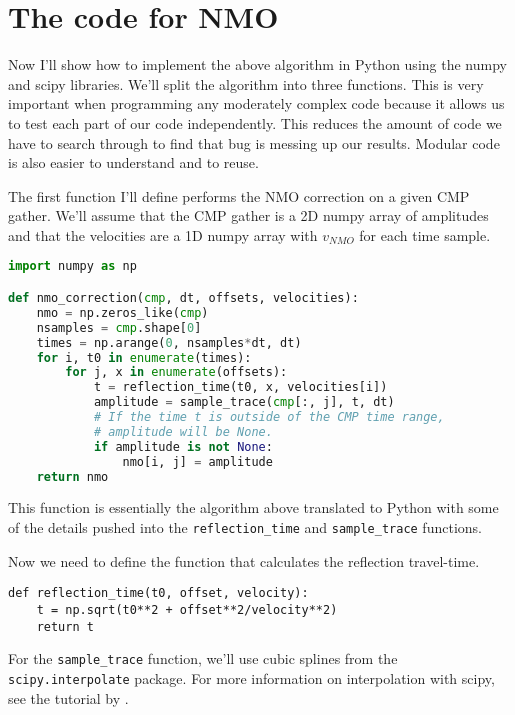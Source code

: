 \section{The code for NMO}

Now I'll show how to implement the above algorithm in Python using the numpy and scipy libraries.
We'll split the algorithm into three functions.
This is very important when programming any moderately complex code because it allows us to test each part of our code independently.
This reduces the amount of code we have to search through to find that bug is messing up our results.
Modular code is also easier to understand and to reuse.

The first function I'll define performs the NMO correction on a given CMP gather.
We'll assume that the CMP gather is a 2D numpy array of amplitudes and that the
velocities are a 1D numpy array with $v_{NMO}$ for each time sample.

\begin{lstlisting}[language=python]
import numpy as np

def nmo_correction(cmp, dt, offsets, velocities):
    nmo = np.zeros_like(cmp)
    nsamples = cmp.shape[0]
    times = np.arange(0, nsamples*dt, dt)
    for i, t0 in enumerate(times):
        for j, x in enumerate(offsets):
            t = reflection_time(t0, x, velocities[i])
            amplitude = sample_trace(cmp[:, j], t, dt)
            # If the time t is outside of the CMP time range,
            # amplitude will be None.
            if amplitude is not None:
                nmo[i, j] = amplitude
    return nmo
\end{lstlisting}

This function is essentially the algorithm above translated to Python with some
of the details pushed into the \texttt{reflection_time} and
\texttt{sample_trace} functions.

Now we need to define the function that calculates the reflection travel-time.

\begin{verbatim}
def reflection_time(t0, offset, velocity):
    t = np.sqrt(t0**2 + offset**2/velocity**2)
    return t
\end{verbatim}

For the \texttt{sample_trace} function, we'll use cubic splines from the
\texttt{scipy.interpolate} package.
For more information on interpolation with scipy, see the tutorial by
\citet{Hall_2016}.

